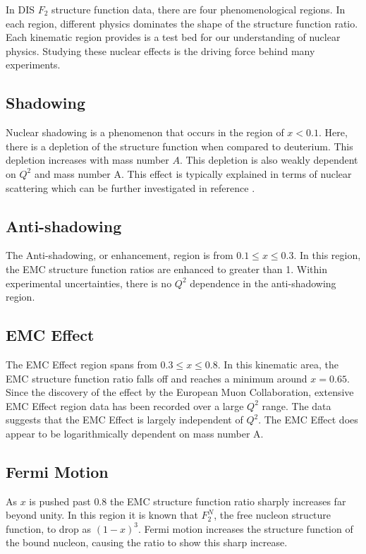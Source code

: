 In DIS $F_2$ structure function data, there are four phenomenological regions. In each region, different physics dominates the shape of the structure function ratio. Each kinematic region provides is a test bed for our understanding of nuclear physics. Studying these nuclear effects is the driving force behind many experiments.

\subsection{Shadowing}

Nuclear shadowing is a phenomenon that occurs in the region of $x<0.1$. Here, there is a depletion of the structure function when compared to deuterium. This depletion increases with mass number $A$. This depletion is also weakly dependent on $Q^2$ and mass number A. This effect is typically explained in terms of nuclear scattering which can be further investigated in reference \cite{shadowing}.

\subsection{Anti-shadowing}

The Anti-shadowing, or enhancement, region is from $0.1 \leq x \leq 0.3$. In this region, the EMC structure function ratios are enhanced to greater than 1. Within experimental uncertainties, there is no $Q^2$ dependence in the anti-shadowing region.

\subsection{EMC Effect}

The EMC Effect region spans from $0.3 \leq x \leq 0.8$. In this kinematic area, the EMC structure function ratio falls off and reaches a minimum around $x=0.65$. Since the discovery of the effect by the European Muon Collaboration, extensive EMC Effect region data has been recorded over a large $Q^2$ range. The data suggests that the EMC Effect is largely independent of $Q^2$. The EMC Effect does appear to be logarithmically dependent on mass number A.

\subsection{Fermi Motion}

As $x$ is pushed past $0.8$ the EMC structure function ratio sharply increases far beyond unity. In this region it is known that $F_2^N$, the free nucleon structure function, to drop as $\left(1-x\right)^3$. Fermi motion increases the structure function of the bound nucleon, causing the ratio to show this sharp increase.